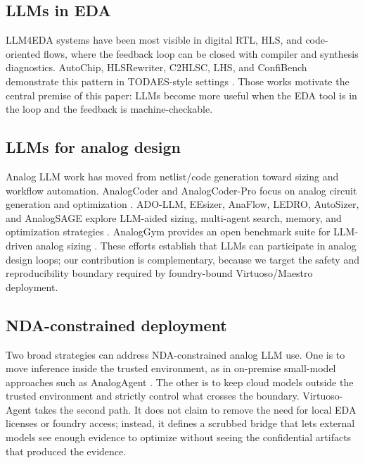 \documentclass[acmsmall,review,anonymous]{acmart}
\newcommand{\framework}{Virtuoso-Agent}
\begin{document}
\subsection{LLMs in EDA}

LLM4EDA systems have been most visible in digital RTL, HLS, and code-oriented
flows, where the feedback loop can be closed with compiler and synthesis
diagnostics. AutoChip, HLSRewriter, C2HLSC, LHS, and ConfiBench demonstrate
this pattern in TODAES-style settings \cite{autochip,hlsrewriter,c2hlsc,lhs,
confibench}. Those works motivate the central premise of this paper: LLMs
become more useful when the EDA tool is in the loop and the feedback is
machine-checkable.

\subsection{LLMs for analog design}

Analog LLM work has moved from netlist/code generation toward sizing and
workflow automation. AnalogCoder and AnalogCoder-Pro focus on analog circuit
generation and optimization \cite{analogcoder,analogcoderpro}. ADO-LLM,
EEsizer, AnaFlow, LEDRO, AutoSizer, and AnalogSAGE explore LLM-aided sizing,
multi-agent search, memory, and optimization strategies
\cite{adollm,eesizer,anaflow,ledro,autosizer,analogsage}. AnalogGym provides
an open benchmark suite for LLM-driven analog sizing \cite{analoggym}. These
efforts establish that LLMs can participate in analog design loops; our
contribution is complementary, because we target the safety and reproducibility
boundary required by foundry-bound Virtuoso/Maestro deployment.

\subsection{NDA-constrained deployment}

Two broad strategies can address NDA-constrained analog LLM use. One is to
move inference inside the trusted environment, as in on-premise small-model
approaches such as AnalogAgent \cite{analogagent}. The other is to keep cloud
models outside the trusted environment and strictly control what crosses the
boundary. \framework{} takes the second path. It does not claim to remove the
need for local EDA licenses or foundry access; instead, it defines a scrubbed
bridge that lets external models see enough evidence to optimize without
seeing the confidential artifacts that produced the evidence.
\end{document}
